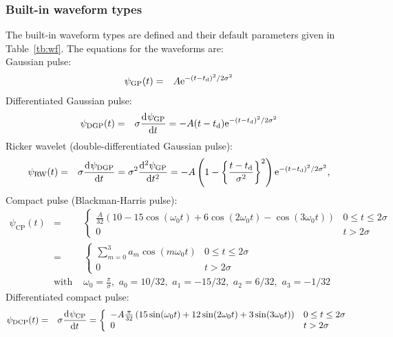 \documentclass[onecolumn,a4paper]{article}
\numberwithin{equation}{section}
\begin{document}
\subsubsection{Built-in waveform types}

The built-in waveform types are defined and their default parameters given in 
Table~\ref{tb:wf}. The equations for the waveforms are:\\

\noindent Gaussian pulse:
\begin{eqnarray}
\psi_\mathrm{GP}(t) &=& A \re^{-( t - t_\mathrm{d} )^2/2 \sigma^2}
\end{eqnarray}
Differentiated Gaussian pulse:
\begin{eqnarray}
\psi_\mathrm{DGP}(t) &=& \sigma \deriv{\psi_\mathrm{GP}}{t} = -A (t - t_\mathrm{d}) \re^{-( t - t_\mathrm{d} )^2/2 \sigma^2}
\end{eqnarray}
Ricker wavelet (double-differentiated Gaussian pulse):
\begin{eqnarray}
\psi_\mathrm{RW}(t)  &=& \sigma \deriv{\psi_\mathrm{DGP}}{t} = \sigma^2 \deriv[2]{\psi_\mathrm{GP}}{t} = -A \left( 1 - \left\{ \frac{t - t_\mathrm{d}}{\sigma^2} \right\}^2 \right) 
\re^{-( t - t_\mathrm{d} )^2/2 \sigma^2},
\end{eqnarray}
Compact pulse (Blackman-Harris pulse):
\begin{eqnarray}
\psi_\mathrm{CP}(t) 
&=& \left\{
\begin{array}{ll} 
\frac{A}{32}\left( 10-15\cos( \omega_0 t) + 6\cos (2\omega_0 t) - \cos (3\omega_0 t) 
\right)   &0 \le t \le 2\sigma \\
0  &t> 2\sigma
\end{array}
\right. \\
&=& \left\{
\begin{array}{ll} 
\sum_{m=0}^3 a_m \cos ( m \omega_0 t)  &0 \le t \le 2\sigma \\
0  &t> 2\sigma
\end{array}
\right. \\
&\mathrm{with}\,\,&\omega_0=\frac{\pi}{\sigma}, \,\,a_0=10/32,\,\,a_1=-15/32,\,\,a_2=6/32,\,\,a_3=-1/32
\end{eqnarray}
Differentiated compact pulse:
\begin{eqnarray}
\psi_\mathrm{DCP}(t) &=&
\sigma \deriv{\psi_\mathrm{CP}}{t}=
\left\{  
\begin{array}{ll} 
-A\frac{\pi}{32} \left( 15\sin(\omega_0 t) +12\sin(2\omega_0 t) + 3 \sin(3\omega_0 t)\right)  &0 \le t \le 2\sigma \\
0                                                                                            &t> 2\sigma
\end{array}
\right.
\end{eqnarray}
\end{document}
